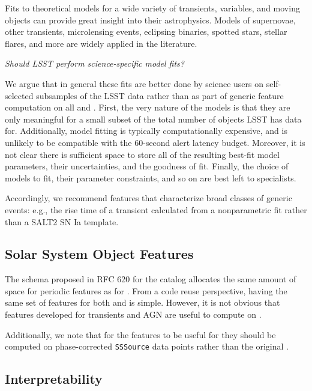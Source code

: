 \documentclass[DM,authoryear,toc]{lsstdoc}
\begin{document}
Fits to theoretical models for a wide variety of transients, variables, and moving objects can provide great insight into their astrophysics.
Models of supernovae, other transients, microlensing events, eclipsing binaries, spotted stars, stellar flares, and more are widely applied in the literature.

\textit{Should LSST perform science-specific model fits?}

We argue that in general these fits are better done by science users on self-selected subsamples of the LSST data rather than as part of generic feature computation on all \DIAObjects and \Objects.
First, the very nature of the models is that they are only meaningful for a small subset of the total number of objects LSST has data for.  
Additionally, model fitting is typically computationally expensive, and is unlikely to be compatible with the 60-second alert latency budget.
Moreover, it is not clear there is sufficient space to store all of the resulting best-fit model parameters, their uncertainties, and the goodness of fit.
Finally, the choice of models to fit, their parameter constraints, and so on are best left to specialists.

Accordingly, we recommend features that characterize broad classes of generic events: e.g., the rise time of a transient calculated from a nonparametric fit rather than a SALT2 SN Ia template.


\subsection{Solar System Object Features}

The schema proposed in RFC 620 for the \SSObject catalog allocates the same amount of space for periodic 
features as for \DIAObjects.
From a code reuse perspective, having the same set of features for both \DIAObjects and \SSObjects is simple.
However, it is not obvious that features developed for transients and AGN are useful to compute on \SSObjects.

Additionally, we note that for the features to be useful for \SSObjects they should be computed on phase-corrected \texttt{SSSource} data points rather than the original \DIASources.

\subsection{Interpretability} \label{sec:interpretability}
\end{document}
